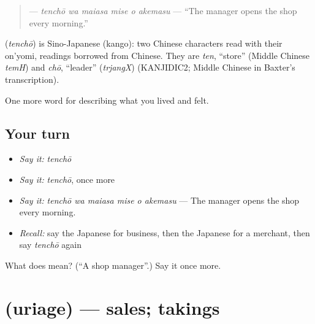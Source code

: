 \begin{quote}
\textbf{   } — \emph{tenchō wa maiasa mise o akemasu} — \textquotedblleft{}The manager opens the shop every morning.\textquotedblright{}
\end{quote}

\begin{cousinweb}
\textbf{} (\emph{tenchō}) is Sino-Japanese (kango): two Chinese characters read with their on'yomi, readings borrowed from Chinese. They are \emph{ten}, \textquotedblleft{}store\textquotedblright{} (Middle Chinese \emph{temH}) and \emph{chō}, \textquotedblleft{}leader\textquotedblright{} (\emph{trjangX}) (KANJIDIC2; Middle Chinese in Baxter's transcription).
\end{cousinweb}

\begin{grammarlens}[title={What you've built}]
One more word for describing what you lived and felt.
\end{grammarlens}

\subsection*{Your turn}
\begin{itemize}
\raggedright
  \item \emph{Say it:} \emph{tenchō}
  \item \emph{Say it:} \emph{tenchō}, once more
  \item \emph{Say it:} \emph{tenchō wa maiasa mise o akemasu} — The manager opens the shop every morning.
  \item \emph{Recall:} say the Japanese for business, then the Japanese for a merchant, then say \emph{tenchō} again
\end{itemize}

\begin{tcolorbox}[breakable,colback=teal!4,colframe=teal!35!black,title={Before you move on}]
What does  mean? (\textquotedblleft{}A shop manager\textquotedblright{}.) Say it once more.
\end{tcolorbox}
\section[\texorpdfstring{\ja{うりあげ} (uriage)}{うりあげ (uriage)}]{ (uriage) — sales; takings}

\label{lesson:JA-C487-uriage}



